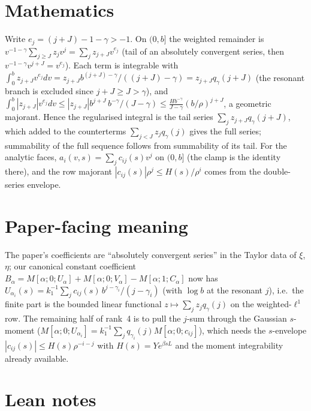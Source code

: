 \documentclass[11pt]{article}
\begin{document}
\section{Mathematics}

Write $e_j=(j+J)-1-\gamma>-1$. On $(0,b]$ the weighted remainder is
$v^{-1-\gamma}\sum_{j\ge J}z_jv^j=\sum_jz_{j+J}v^{e_j}$ (tail of an absolutely convergent series,
then $v^{-1-\gamma}v^{j+J}=v^{e_j}$). Each term is integrable with
$\int_0^bz_{j+J}v^{e_j}dv=z_{j+J}b^{(j+J)-\gamma}/((j+J)-\gamma)=z_{j+J}q_\gamma(j+J)$ (the resonant
branch is excluded since $j+J\ge J>\gamma$), and
$\int_0^b|z_{j+J}|v^{e_j}dv\le|z_{j+J}|b^{j+J}\,b^{-\gamma}/(J-\gamma)\le\frac{Hb^{-\gamma}}{J-\gamma}(b/\rho)^{j+J}$,
a geometric majorant. Hence the regularised integral is the tail series
$\sum_jz_{j+J}q_\gamma(j+J)$, which added to the counterterms $\sum_{j<J}z_jq_\gamma(j)$ gives the
full series; summability of the full sequence follows from summability of its tail. For the analytic
faces, $a_i(v,s)=\sum_jc_{ij}(s)v^j$ on $(0,b]$ (the clamp is the identity there), and the row
majorant $|c_{ij}(s)|\rho^j\le H(s)/\rho^i$ comes from the double-series envelope.

\section{Paper-facing meaning}

The paper's coefficients are ``absolutely convergent series'' in the Taylor data of $\xi$, $\eta$;
our canonical constant coefficient $B_\alpha=M[\alpha;0;U_\alpha]+M[\alpha;0;V_\alpha]-M[\alpha;1;C_\alpha]$
now has $U_{\alpha_i}(s)=k_1^{-1}\sum_jc_{ij}(s)\,b^{j-\gamma_i}/(j-\gamma_i)$ (with $\log b$ at the
resonant $j$), i.e.\ the finite part is the bounded linear functional $z\mapsto\sum_jz_jq_\gamma(j)$
on the weighted-$\ell^1$ row. The remaining half of rank~4 is to pull the $j$-sum through the
Gaussian $s$-moment ($M[\alpha;0;U_{\alpha_i}]=k_1^{-1}\sum_jq_{\gamma_i}(j)M[\alpha;0;c_{ij}]$),
which needs the $s$-envelope $|c_{ij}(s)|\le H(s)\rho^{-i-j}$ with $H(s)=Ye^{\beta sL}$ and the
moment integrability already available.

\section{Lean notes}
\end{document}
